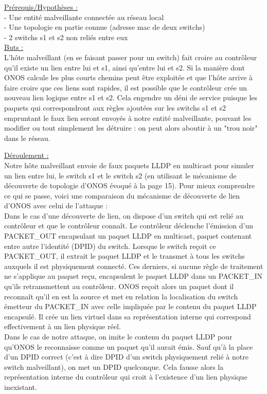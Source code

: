 \underline{Prérequis/Hypothèses :}\\
- Une entité malveillante connectée au réseau local\\
- Une topologie en partie connue (adresse mac de deux switchs)\\
- 2 switchs s1 et s2 non reliés entre eux\\


\underline{Buts :}\\
L’hôte malveillant (en se faisant passer pour un switch) fait croire au contrôleur qu’il existe un lien entre lui et s1, ainsi qu’entre lui et s2. Si la manière dont ONOS calcule les plus courts chemins peut être exploitée et que l'hôte arrive à faire croire que ces liens sont rapides, il est possible que le contrôleur crée un nouveau lien logique entre s1 et s2. Cela engendre un déni de service puisque les paquets qui correspondront aux règles ajoutées sur les switchs s1 et s2 empruntant le faux lien seront envoyés à notre entité malveillante, pouvant les modifier ou tout simplement les détruire : on peut alors aboutir à un "trou noir" dans le réseau.

\underline{Déroulement :}\\
Notre hôte malveillant envoie de faux paquets LLDP en multicast pour simuler un lien entre lui, le switch s1 et le switch s2 (en utilisant le mécanisme de découverte de topologie d'ONOS évoqué à la page 15). 
Pour mieux comprendre ce qui se passe, voici une comparaison du mécanisme de découverte de lien d'ONOS avec celui de l'attaque :\\
Dans le cas d'une découverte de lien, on dispose d'un switch qui est relié au contrôleur et que le contrôleur connaît. Le contrôleur déclenche l'émission d'un PACKET\_OUT encapsulant un paquet LLDP en multicast, paquet contenant entre autre l'identité (DPID) du switch. Lorsque le switch reçoit ce PACKET\_OUT, il extrait le paquet LLDP et le transmet à tous les switchs auxquels il est physiquement connecté. Ces derniers, si aucune règle de traitement ne s'applique au paquet reçu, encapsulent le paquet LLDP dans un PACKET\_IN qu'ils retransmettent au contrôleur. ONOS reçoit alors un paquet dont il reconnaît qu'il en est la source et met en relation la localisation du switch émetteur du PACKET\_IN avec celle impliquée par le contenu du paquet LLDP encapsulé. Il crée un lien virtuel dans sa représentation interne qui correspond effectivement à un lien physique réel.\\
Dans le cas de notre attaque, on imite le contenu du paquet LLDP pour qu'ONOS le reconnaisse comme un paquet qu'il aurait émis. Sauf qu'à la place d'un DPID correct (c'est à dire DPID d'un switch physiquement relié à notre switch malveillant), on met un DPID quelconque. Cela fausse alors la représentation interne du contrôleur qui croit à l'existence d'un lien physique inexistant.

